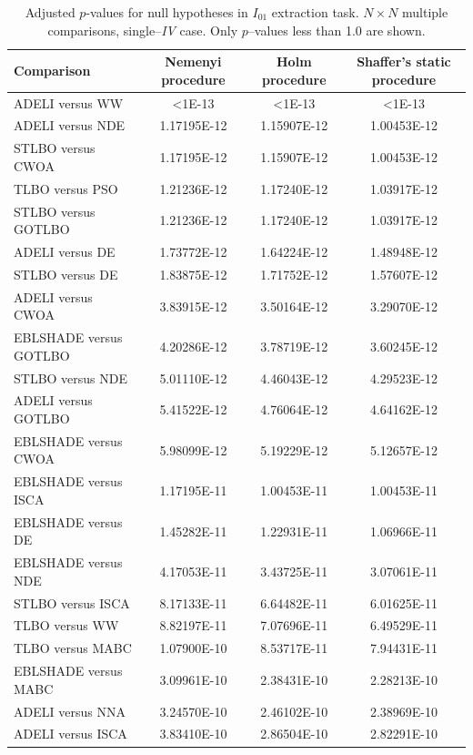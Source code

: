 \documentclass[a4paper,fleqn]{cas-sc}
\begin{document}
\begin{table}[<options>]
\renewcommand{\arraystretch}{0.95}

\caption{Adjusted $p$-values for null hypotheses in $I_{01}$ extraction task.
         $N\times N$ multiple comparisons,
         single--\emph{IV} case.
          Only $p$--values less than 1.0 are shown.
         }\label{tblNNpValueI01}
\begin{tabular*}{\tblwidth}{@{}LCCC@{}}
\toprule
Comparison& Nemenyi procedure& Holm procedure& Shaffer’s static procedure\\ %
\midrule
ADELI versus WW&<1E-13&<1E-13&<1E-13\\
ADELI versus NDE&1.17195E-12&1.15907E-12&1.00453E-12\\
STLBO versus CWOA&1.17195E-12&1.15907E-12&1.00453E-12\\
TLBO versus PSO&1.21236E-12&1.17240E-12&1.03917E-12\\
STLBO versus GOTLBO&1.21236E-12&1.17240E-12&1.03917E-12\\
ADELI versus DE&1.73772E-12&1.64224E-12&1.48948E-12\\
STLBO versus DE&1.83875E-12&1.71752E-12&1.57607E-12\\
ADELI versus CWOA&3.83915E-12&3.50164E-12&3.29070E-12\\
EBLSHADE versus GOTLBO&4.20286E-12&3.78719E-12&3.60245E-12\\
STLBO versus NDE&5.01110E-12&4.46043E-12&4.29523E-12\\
ADELI versus GOTLBO&5.41522E-12&4.76064E-12&4.64162E-12\\
EBLSHADE versus CWOA&5.98099E-12&5.19229E-12&5.12657E-12\\
EBLSHADE versus ISCA&1.17195E-11&1.00453E-11&1.00453E-11\\
EBLSHADE versus DE&1.45282E-11&1.22931E-11&1.06966E-11\\
EBLSHADE versus NDE&4.17053E-11&3.43725E-11&3.07061E-11\\
STLBO versus ISCA&8.17133E-11&6.64482E-11&6.01625E-11\\
TLBO versus WW&8.82197E-11&7.07696E-11&6.49529E-11\\
TLBO versus MABC&1.07900E-10&8.53717E-11&7.94431E-11\\
EBLSHADE versus MABC&3.09961E-10&2.38431E-10&2.28213E-10\\
ADELI versus NNA&3.24570E-10&2.46102E-10&2.38969E-10\\
ADELI versus ISCA&3.83410E-10&2.86504E-10&2.82291E-10\\

\end{tabular*}
\end{table}
\end{document}
